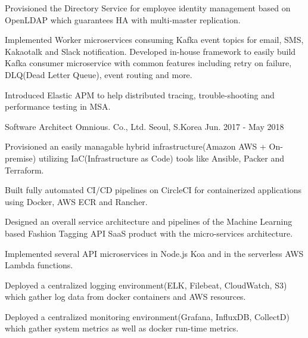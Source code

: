 \begin{cventries}
{\begin{cvitems}
        \item {Provisioned the Directory Service for employee identity management based on OpenLDAP which guarantees HA with multi-master replication.}
        \item {Implemented Worker microservices consuming Kafka event topics for email, SMS, Kakaotalk and Slack notification. Developed in-house framework to easily build Kafka consumer microservice with common features including retry on failure, DLQ(Dead Letter Queue), event routing and more.}
        \item {Introduced Elastic APM to help distributed tracing, trouble-shooting and performance testing in MSA.}
      \end{cvitems}
    }

  \cventry
    {Software Architect} %
    {Omnious. Co., Ltd.} %
    {Seoul, S.Korea} %
    {Jun. 2017 - May 2018} %
    {
      \begin{cvitems} %
        \item {Provisioned an easily managable hybrid infrastructure(Amazon AWS + On-premise) utilizing IaC(Infrastructure as Code) tools like Ansible, Packer and Terraform.}
        \item {Built fully automated CI/CD pipelines on CircleCI for containerized applications using Docker, AWS ECR and Rancher.}
        \item {Designed an overall service architecture and pipelines of the Machine Learning based Fashion Tagging API SaaS product with the micro-services architecture.}
        \item {Implemented several API microservices in Node.js Koa and in the serverless AWS Lambda functions.}
        \item {Deployed a centralized logging environment(ELK, Filebeat, CloudWatch, S3) which gather log data from docker containers and AWS resources.}
        \item {Deployed a centralized monitoring environment(Grafana, InfluxDB, CollectD) which gather system metrics as well as docker run-time metrics.}
      \end{cvitems}
    }


\end{cventries}
